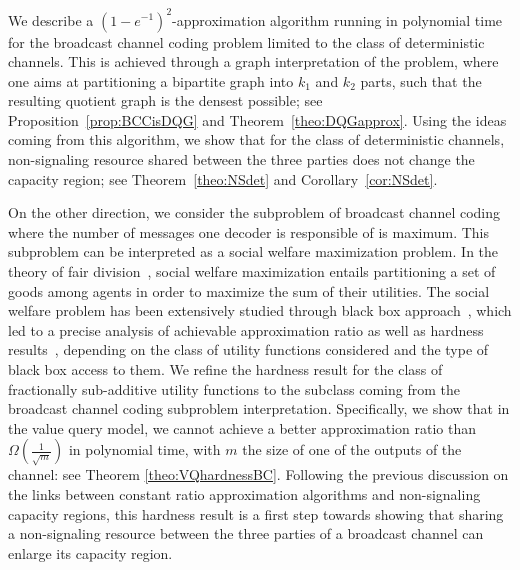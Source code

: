 We describe a $(1-e^{-1})^2$-approximation algorithm running in polynomial time for the broadcast channel coding problem limited to the class of deterministic channels. This is achieved through a graph interpretation of the problem, where one aims at partitioning a bipartite graph into $k_1$ and $k_2$ parts, such that the resulting quotient graph is the densest possible; see Proposition~\ref{prop:BCCisDQG} and Theorem~\ref{theo:DQGapprox}. Using the ideas coming from this algorithm, we show that for the class of deterministic channels, non-signaling resource shared between the three parties does not change the capacity region; see Theorem~\ref{theo:NSdet} and Corollary~\ref{cor:NSdet}.

On the other direction, we consider the subproblem of broadcast channel coding where the number of messages one decoder is responsible of is maximum. This subproblem can be interpreted as a social welfare maximization problem. In the theory of fair division~\cite{BT96,Moulin03}, social welfare maximization entails partitioning a set of goods among agents in order to maximize the sum of their utilities. The social welfare problem has been extensively studied through black box approach~\cite{BN05}, which led to a precise analysis of achievable approximation ratio as well as hardness results~\cite{DS06,MSV08}, depending on the class of utility functions considered and the type of black box access to them. We refine the hardness result for the class of fractionally sub-additive utility functions to the subclass coming from the broadcast channel coding subproblem interpretation. Specifically, we show that in the value query model, we cannot achieve a better approximation ratio than $\Omega\left(\frac{1}{\sqrt{m}}\right)$ in polynomial time, with $m$ the size of one of the outputs of the channel: see Theorem \ref{theo:VQhardnessBC}. Following the previous discussion on the links between constant ratio approximation algorithms and non-signaling capacity regions, this hardness result is a first step towards showing that sharing a non-signaling resource between the three parties of a broadcast channel can enlarge its capacity region.

